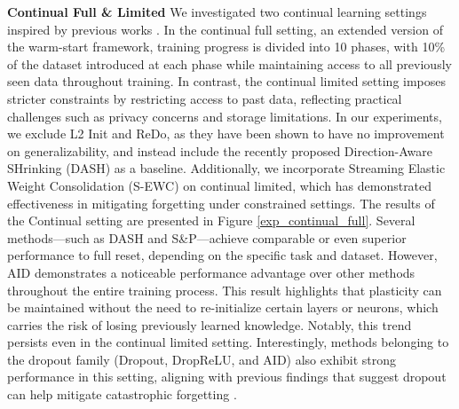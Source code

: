 \textbf{Continual Full \& Limited} \quad
We investigated two continual learning settings inspired by previous works \citep{lee2024slow,shen2024step}. In the continual full setting, an extended version of the warm-start framework, training progress is divided into 10 phases, with 10\% of the dataset introduced at each phase while maintaining access to all previously seen data throughout training.
In contrast, the continual limited setting imposes stricter constraints by restricting access to past data, reflecting practical challenges such as privacy concerns and storage limitations.
In our experiments, we exclude L2 Init and ReDo, as they have been shown to have no improvement on generalizability, and instead include the recently proposed Direction-Aware SHrinking (DASH) \cite{shindash} as a baseline.
Additionally, we incorporate Streaming Elastic Weight Consolidation (S-EWC) \cite{kirkpatrick2017overcoming, elsayed2024addressing} on continual limited, which has demonstrated effectiveness in mitigating forgetting under constrained settings.
The results of the Continual setting are presented in Figure \ref{exp_continual_full}.
Several methods—such as DASH and S\&P—achieve comparable or even superior performance to full reset, depending on the specific task and dataset.
However, AID demonstrates a noticeable performance advantage over other methods throughout the entire training process.
This result highlights that plasticity can be maintained without the need to re-initialize certain layers or neurons, which carries the risk of losing previously learned knowledge.
Notably, this trend persists even in the continual limited setting.
Interestingly, methods belonging to the dropout family (Dropout, DropReLU, and AID) also exhibit strong performance in this setting, aligning with previous findings that suggest dropout can help mitigate catastrophic forgetting \cite{mirzadeh2020dropout}.

